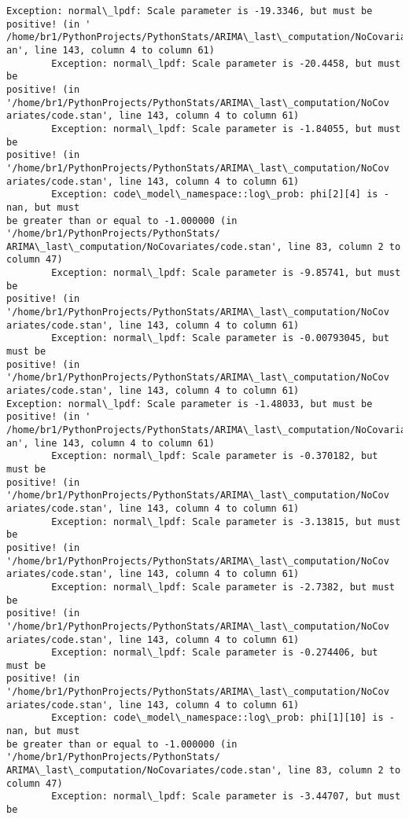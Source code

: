 \documentclass[11pt]{article}
\begin{document}
\begin{Verbatim}[commandchars=\\\{\}]
Exception: normal\_lpdf: Scale parameter is -19.3346, but must be positive! (in '
/home/br1/PythonProjects/PythonStats/ARIMA\_last\_computation/NoCovariates/code.st
an', line 143, column 4 to column 61)
        Exception: normal\_lpdf: Scale parameter is -20.4458, but must be
positive! (in '/home/br1/PythonProjects/PythonStats/ARIMA\_last\_computation/NoCov
ariates/code.stan', line 143, column 4 to column 61)
        Exception: normal\_lpdf: Scale parameter is -1.84055, but must be
positive! (in '/home/br1/PythonProjects/PythonStats/ARIMA\_last\_computation/NoCov
ariates/code.stan', line 143, column 4 to column 61)
        Exception: code\_model\_namespace::log\_prob: phi[2][4] is -nan, but must
be greater than or equal to -1.000000 (in '/home/br1/PythonProjects/PythonStats/
ARIMA\_last\_computation/NoCovariates/code.stan', line 83, column 2 to column 47)
        Exception: normal\_lpdf: Scale parameter is -9.85741, but must be
positive! (in '/home/br1/PythonProjects/PythonStats/ARIMA\_last\_computation/NoCov
ariates/code.stan', line 143, column 4 to column 61)
        Exception: normal\_lpdf: Scale parameter is -0.00793045, but must be
positive! (in '/home/br1/PythonProjects/PythonStats/ARIMA\_last\_computation/NoCov
ariates/code.stan', line 143, column 4 to column 61)
Exception: normal\_lpdf: Scale parameter is -1.48033, but must be positive! (in '
/home/br1/PythonProjects/PythonStats/ARIMA\_last\_computation/NoCovariates/code.st
an', line 143, column 4 to column 61)
        Exception: normal\_lpdf: Scale parameter is -0.370182, but must be
positive! (in '/home/br1/PythonProjects/PythonStats/ARIMA\_last\_computation/NoCov
ariates/code.stan', line 143, column 4 to column 61)
        Exception: normal\_lpdf: Scale parameter is -3.13815, but must be
positive! (in '/home/br1/PythonProjects/PythonStats/ARIMA\_last\_computation/NoCov
ariates/code.stan', line 143, column 4 to column 61)
        Exception: normal\_lpdf: Scale parameter is -2.7382, but must be
positive! (in '/home/br1/PythonProjects/PythonStats/ARIMA\_last\_computation/NoCov
ariates/code.stan', line 143, column 4 to column 61)
        Exception: normal\_lpdf: Scale parameter is -0.274406, but must be
positive! (in '/home/br1/PythonProjects/PythonStats/ARIMA\_last\_computation/NoCov
ariates/code.stan', line 143, column 4 to column 61)
        Exception: code\_model\_namespace::log\_prob: phi[1][10] is -nan, but must
be greater than or equal to -1.000000 (in '/home/br1/PythonProjects/PythonStats/
ARIMA\_last\_computation/NoCovariates/code.stan', line 83, column 2 to column 47)
        Exception: normal\_lpdf: Scale parameter is -3.44707, but must be

\end{Verbatim}
\end{document}
